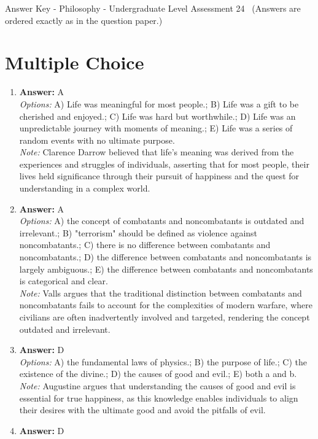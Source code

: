 \documentclass[12pt]{article}
\begin{document}
\begin{center}
Answer Key - Philosophy - Undergraduate Level Assessment 24 \
\small (Answers are ordered exactly as in the question paper.)
\end{center}

\section*{Multiple Choice}
\begin{enumerate}[label=\arabic*.]
\item \textbf{Answer:} A
\\ \textit{Options:} A) Life was meaningful for most people.; B) Life was a gift to be cherished and enjoyed.; C) Life was hard but worthwhile.; D) Life was an unpredictable journey with moments of meaning.; E) Life was a series of random events with no ultimate purpose.
\\ \textit{Note:} Clarence Darrow believed that life's meaning was derived from the experiences and struggles of individuals, asserting that for most people, their lives held significance through their pursuit of happiness and the quest for understanding in a complex world.
\item \textbf{Answer:} A
\\ \textit{Options:} A) the concept of combatants and noncombatants is outdated and irrelevant.; B) "terrorism" should be defined as violence against noncombatants.; C) there is no difference between combatants and noncombatants.; D) the difference between combatants and noncombatants is largely ambiguous.; E) the difference between combatants and noncombatants is categorical and clear.
\\ \textit{Note:} Valls argues that the traditional distinction between combatants and noncombatants fails to account for the complexities of modern warfare, where civilians are often inadvertently involved and targeted, rendering the concept outdated and irrelevant.
\item \textbf{Answer:} D
\\ \textit{Options:} A) the fundamental laws of physics.; B) the purpose of life.; C) the existence of the divine.; D) the causes of good and evil.; E) both a and b.
\\ \textit{Note:} Augustine argues that understanding the causes of good and evil is essential for true happiness, as this knowledge enables individuals to align their desires with the ultimate good and avoid the pitfalls of evil.
\item \textbf{Answer:} D

\end{enumerate}
\end{document}
